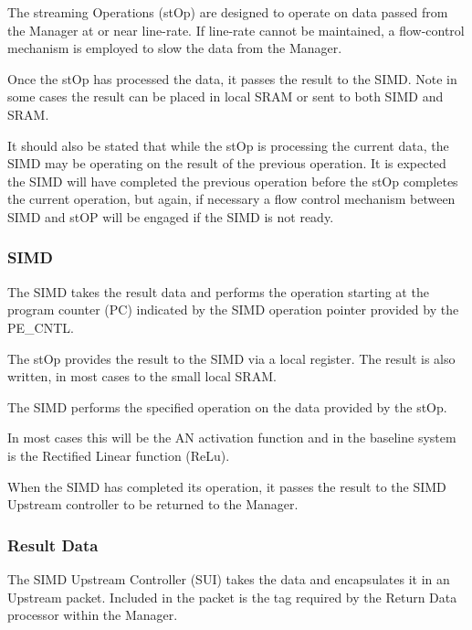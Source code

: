 \documentclass[journal]{IEEEtran}
\begin{document}
The streaming Operations (stOp) are designed to operate on data passed from the Manager at or near line-rate. If line-rate cannot be maintained, a flow-control mechanism is employed to slow the data from the Manager.

Once the stOp has processed the data, it passes the result to the SIMD. Note in some cases the result can be placed in local SRAM or sent to both SIMD and SRAM.

It should also be stated that while the stOp is processing the current data, the SIMD may be operating on the result of the previous operation. It is expected the SIMD will have completed the previous operation before the stOp completes the current operation, but again, if necessary a flow control mechanism between SIMD and stOP will be engaged if the SIMD is not ready.

\subsubsection{SIMD}
\label{ssec:simd}

The SIMD takes the result data and performs the operation starting at the program counter (PC) indicated by the SIMD operation pointer provided by the PE\_CNTL.

The stOp provides the result to the SIMD via a local register. The result is also written, in most cases to the small local SRAM.

The SIMD performs the specified operation on the data provided by the stOp.

In most cases this will be the AN activation function and in the baseline system is the Rectified Linear function (ReLu).

When the SIMD has completed its operation, it passes the result to the SIMD Upstream controller to be returned to the Manager.

\subsubsection{Result Data}
\label{ssec:result}

The SIMD Upstream Controller (SUI) takes the data and encapsulates it in an Upstream packet. Included in the packet is the tag required by the Return Data processor within the Manager.

\fi


\end{document}
